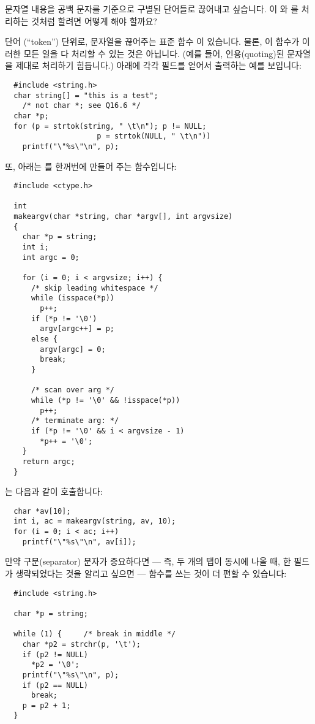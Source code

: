 \begin{faq}
	문자열 내용을 공백 문자를 기준으로 구별된 단어들로 끊어내고 싶습니다.
        이 와 를 처리하는 것처럼 할려면 어떻게
        해야 할까요?

\A
	단어 (``token'') 단위로, 문자열을 끊어주는 표준 함수
	이 있습니다. 물론, 이 함수가 이러한 모든 일을 다 처리할 수
	있는 것은 아닙니다.  (예를 들어, 인용(quoting)된 문자열을
        제대로 처리하기 힘듭니다.) 아래에 각각 필드를 얻어서 출력하는
        예를 보입니다:
\begin{verbatim}
  #include <string.h>
  char string[] = "this is a test"; 
    /* not char *; see Q16.6 */
  char *p;
  for (p = strtok(string, " \t\n"); p != NULL;
                     p = strtok(NULL, " \t\n"))
    printf("\"%s\"\n", p);
\end{verbatim}

	또, 아래는 를 한꺼번에 만들어 주는 함수입니다:
\begin{verbatim}
  #include <ctype.h>

  int
  makeargv(char *string, char *argv[], int argvsize)
  {
    char *p = string;
    int i;
    int argc = 0;

    for (i = 0; i < argvsize; i++) {
      /* skip leading whitespace */
      while (isspace(*p))
        p++;
      if (*p != '\0')
        argv[argc++] = p;
      else {
        argv[argc] = 0;
        break;
      }

      /* scan over arg */
      while (*p != '\0' && !isspace(*p))
        p++;
      /* terminate arg: */
      if (*p != '\0' && i < argvsize - 1)
        *p++ = '\0';
    }
    return argc;
  }
\end{verbatim}
	는 다음과 같이 호출합니다:
\begin{verbatim}
  char *av[10];
  int i, ac = makeargv(string, av, 10);
  for (i = 0; i < ac; i++)
    printf("\"%s\"\n", av[i]);
\end{verbatim}
	만약 구분(separator) 문자가 중요하다면 --- 즉, 두 개의 탭이
        동시에 나올 때, 한 필드가 생략되었다는 것을 알리고 싶으면 ---
         함수를 쓰는 것이 더 편할 수 있습니다:
\begin{verbatim}
  #include <string.h>

  char *p = string;

  while (1) {     /* break in middle */
    char *p2 = strchr(p, '\t');
    if (p2 != NULL)
      *p2 = '\0';
    printf("\"%s\"\n", p);
    if (p2 == NULL)
      break;
    p = p2 + 1;
  }
\end{verbatim}


\end{faq}
